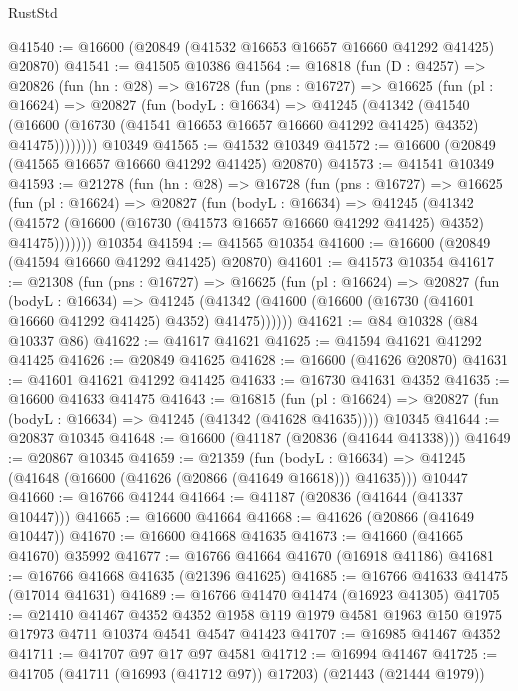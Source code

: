 \begin{lexlean}{RustStd}
\begin{coremodule}
@41540 := @16600 (@20849 (@41532 @16653 @16657 @16660 @41292 @41425) @20870)
@41541 := @41505 @10386
@41564 := @16818
    (fun (D : @4257) =>
    @20826
      (fun (hn : @28) =>
      @16728
        (fun (pns : @16727) =>
        @16625
          (fun (pl : @16624) =>
          @20827
            (fun (bodyL : @16634) =>
            @41245
              (@41342
                (@41540
                  (@16600 (@16730 (@41541 @16653 @16657 @16660 @41292 @41425) @4352) @41475))))))))
    @10349
@41565 := @41532 @10349
@41572 := @16600 (@20849 (@41565 @16657 @16660 @41292 @41425) @20870)
@41573 := @41541 @10349
@41593 := @21278
    (fun (hn : @28) =>
    @16728
      (fun (pns : @16727) =>
      @16625
        (fun (pl : @16624) =>
        @20827
          (fun (bodyL : @16634) =>
          @41245
            (@41342
              (@41572 (@16600 (@16730 (@41573 @16657 @16660 @41292 @41425) @4352) @41475)))))))
    @10354
@41594 := @41565 @10354
@41600 := @16600 (@20849 (@41594 @16660 @41292 @41425) @20870)
@41601 := @41573 @10354
@41617 := @21308
    (fun (pns : @16727) =>
    @16625
      (fun (pl : @16624) =>
      @20827
        (fun (bodyL : @16634) =>
        @41245 (@41342 (@41600 (@16600 (@16730 (@41601 @16660 @41292 @41425) @4352) @41475))))))
@41621 := @84 @10328 (@84 @10337 @86)
@41622 := @41617 @41621
@41625 := @41594 @41621 @41292 @41425
@41626 := @20849 @41625
@41628 := @16600 (@41626 @20870)
@41631 := @41601 @41621 @41292 @41425
@41633 := @16730 @41631 @4352
@41635 := @16600 @41633 @41475
@41643 := @16815
    (fun (pl : @16624) => @20827 (fun (bodyL : @16634) => @41245 (@41342 (@41628 @41635))))
    @10345
@41644 := @20837 @10345
@41648 := @16600 (@41187 (@20836 (@41644 @41338)))
@41649 := @20867 @10345
@41659 := @21359
    (fun (bodyL : @16634) => @41245 (@41648 (@16600 (@41626 (@20866 (@41649 @16618))) @41635)))
    @10447
@41660 := @16766 @41244
@41664 := @41187 (@20836 (@41644 (@41337 @10447)))
@41665 := @16600 @41664
@41668 := @41626 (@20866 (@41649 @10447))
@41670 := @16600 @41668 @41635
@41673 := @41660 (@41665 @41670) @35992
@41677 := @16766 @41664 @41670 (@16918 @41186)
@41681 := @16766 @41668 @41635 (@21396 @41625)
@41685 := @16766 @41633 @41475 (@17014 @41631)
@41689 := @16766 @41470 @41474 (@16923 @41305)
@41705 := @21410
    @41467
    @4352
    @4352
    @1958
    @119
    @1979
    @4581
    @1963
    @150
    @1975
    @17973
    @4711
    @10374
    @4541
    @4547
    @41423
@41707 := @16985 @41467 @4352
@41711 := @41707 @97 @17 @97 @4581
@41712 := @16994 @41467
@41725 := @41705
    (@41711 (@16993 (@41712 @97)) @17203)
    (@21443 (@21444 @1979))

\end{coremodule}
\end{lexlean}
